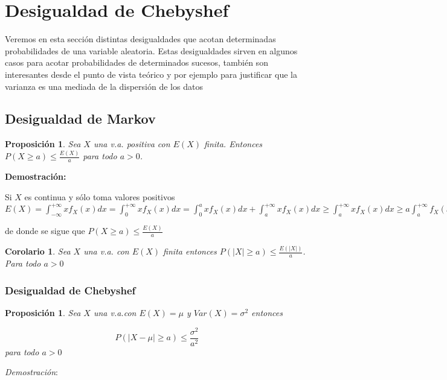 \documentclass[12pt]{report}
\newtheorem{proposition}[definition]{Proposici\'on}
\newtheorem{corollary}[definition]{Corolario}
\begin{document}
        \section{ Desigualdad de Chebyshef}

Veremos en esta sección distintas desigualdades que acotan determinadas probabilidades de
una variable aleatoria. Estas desigualdades sirven en algunos casos para acotar
probabilidades de determinados sucesos, también son interesantes desde el punto de vista
teórico y por ejemplo para justificar que la varianza es una mediada de la dispersión de
los datos
              \subsection{Desigualdad de Markov}
\begin{proposition}
              Sea $X$ una v.a. positiva con $E(X)$ finita. Entonces
              $P(X\geq a)\leq \frac{E(X)}{a}$ para todo $a>0$.
\end{proposition}
\textbf{Demostración: }

              Si $X$ es continua  y sólo toma valores positivos\newline
              $\displaystyle E(X)=\int_{-\infty}^{+\infty} x f_{X}(x)
              dx=\int_{0}^{+\infty} x f_{X}(x) dx=
              \displaystyle \int_{0}^{a} x f_{X}(x)
              dx+\int_{a}^{+\infty} x f_{X}(x) dx \geq \int_{a}^{+\infty} x
              f_{X}(x) dx \geq\displaystyle a \int_{a}^{+\infty}
              f_{X}(x) dx=a P(X\geq a)$

              de donde se sigue que  $P(X\geq a)\leq \frac{E(X)}{a}$

          \begin{corollary}
          Sea $X$ una v.a. con $E(X)$ finita entonces $P(|X|\geq a )\leq
          \frac{E(|X|)}{a}$. Para todo $a>0$
          \end{corollary}


          \subsubsection{Desigualdad de Chebyshef}
          \begin{proposition}
          Sea  $X$ una v.a.con $E(X)=\mu$ y $Var(X)=\sigma^2$ entonces

          $$P(|X-\mu|\geq a)\leq \frac{\sigma^{2}}{a^2}$$ para todo $a>0$
\end{proposition}
          \textit{Demostración}:
\end{document}
